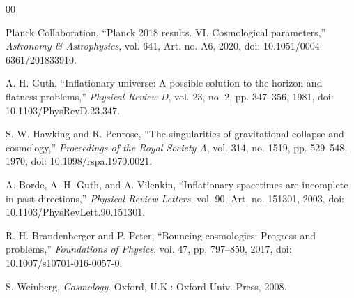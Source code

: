 \documentclass[10pt,conference]{IEEEtran}
\begin{document}
\begin{thebibliography}{00}

Planck Collaboration, ``Planck 2018 results. VI. Cosmological parameters,'' \emph{Astronomy \& Astrophysics}, vol. 641, Art. no. A6, 2020, doi: 10.1051/0004-6361/201833910.

A. H. Guth, ``Inflationary universe: A possible solution to the horizon and flatness problems,'' \emph{Physical Review D}, vol. 23, no. 2, pp. 347--356, 1981, doi: 10.1103/PhysRevD.23.347.

S. W. Hawking and R. Penrose, ``The singularities of gravitational collapse and cosmology,'' \emph{Proceedings of the Royal Society A}, vol. 314, no. 1519, pp. 529--548, 1970, doi: 10.1098/rspa.1970.0021.

A. Borde, A. H. Guth, and A. Vilenkin, ``Inflationary spacetimes are incomplete in past directions,'' \emph{Physical Review Letters}, vol. 90, Art. no. 151301, 2003, doi: 10.1103/PhysRevLett.90.151301.

R. H. Brandenberger and P. Peter, ``Bouncing cosmologies: Progress and problems,'' \emph{Foundations of Physics}, vol. 47, pp. 797--850, 2017, doi: 10.1007/s10701-016-0057-0.

S. Weinberg, \emph{Cosmology}. Oxford, U.K.: Oxford Univ. Press, 2008.

\end{thebibliography}
\end{document}
